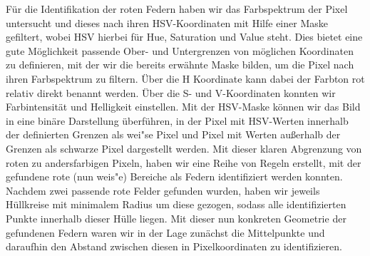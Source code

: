 \documentclass[10pt]{article}
\begin{document}
Für die Identifikation der roten Federn haben wir das Farbspektrum der Pixel untersucht und dieses nach ihren HSV-Koordinaten mit Hilfe einer Maske gefiltert, wobei HSV hierbei für Hue, Saturation und Value steht.
Dies bietet eine gute Möglichkeit passende Ober- und Untergrenzen von möglichen Koordinaten zu definieren, mit der wir die bereits erwähnte Maske bilden, um die Pixel nach ihren Farbspektrum zu filtern.
Über die H Koordinate kann dabei der Farbton rot relativ direkt benannt werden.
Über die S- und V-Koordinaten konnten wir Farbintensität und Helligkeit einstellen.
Mit der HSV-Maske können wir das Bild in eine binäre Darstellung überführen, in der Pixel mit HSV-Werten innerhalb der definierten Grenzen als wei"se Pixel und Pixel mit Werten außerhalb der Grenzen als schwarze Pixel dargestellt werden.
Mit dieser klaren Abgrenzung von roten zu andersfarbigen Pixeln, haben wir eine Reihe von Regeln erstellt, mit der gefundene rote (nun weis"e) Bereiche als Federn identifiziert werden konnten.
Nachdem zwei passende rote Felder gefunden wurden, haben wir jeweils Hüllkreise mit minimalem Radius um diese gezogen, sodass alle identifizierten Punkte innerhalb dieser Hülle liegen.
Mit dieser nun konkreten Geometrie der gefundenen Federn waren wir in der Lage zunächst die Mittelpunkte und daraufhin den Abstand zwischen diesen in Pixelkoordinaten zu identifizieren.
\end{document}
